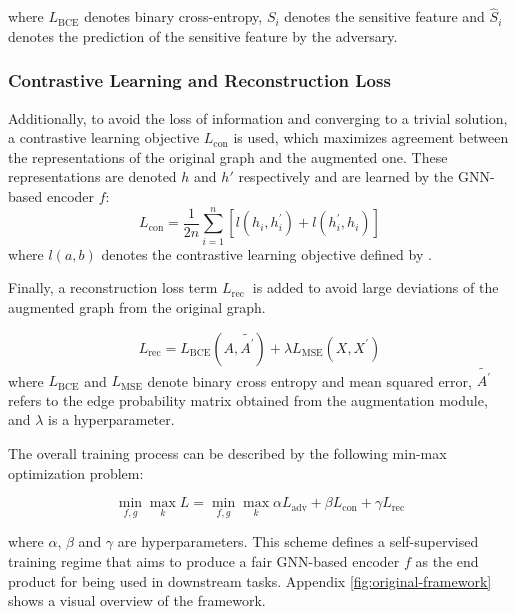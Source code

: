 where $L_{\text{BCE}}$ denotes binary cross-entropy, $S_i$ denotes the sensitive feature and $\hat{S}_i$ denotes the prediction of the sensitive feature by the adversary.

\subsubsection{Contrastive Learning and Reconstruction Loss}

Additionally, to avoid the loss of information and converging to a trivial solution, a contrastive learning objective $L_{\mathrm{con}}$ is used, which maximizes agreement between the representations of the original graph and the augmented one. These representations are denoted $h$ and $h'$ respectively and are learned by the GNN-based encoder $f$:
$$
L_{\mathrm{con}}=\frac{1}{2 n} \sum_{i=1}^n\left[l\left(h_i, h_i^{\prime}\right)+l\left(h_i^{\prime}, h_i\right)\right]
$$
where $l\left(a, b\right)$ denotes the contrastive learning objective defined by \citet{zhu2020deep}.


Finally, a reconstruction loss term $L_{\text {rec }}$ is added to avoid large deviations of the augmented graph from the original graph.

$$
L_{\text{rec}} = L_{\text{BCE}}\left(A, \widetilde{A^{\prime}}\right)+\lambda L_{\text{MSE}}\left(X, X^{\prime}\right)
$$ where $L_{\text{BCE}}$ and $L_{\text{MSE}}$ denote binary cross entropy and mean squared error, $\widetilde{A^{\prime}}$ refers to the edge probability matrix obtained from the augmentation module, and $\lambda$ is a hyperparameter.

The overall training process can be described by the following min-max optimization problem:

$$
\min_{f, g} \max_k L = \min_{f, g} \max_k \alpha L_{\text{adv}} + \beta L_{\text{con}} + \gamma L_{\text{rec}}
$$

where $\alpha$, $\beta$ and $\gamma$ are hyperparameters. This scheme defines a self-supervised training regime that aims to produce a fair GNN-based encoder $f$ as the end product for being used in downstream tasks. Appendix \ref{fig:original-framework} shows a visual overview of the framework.

